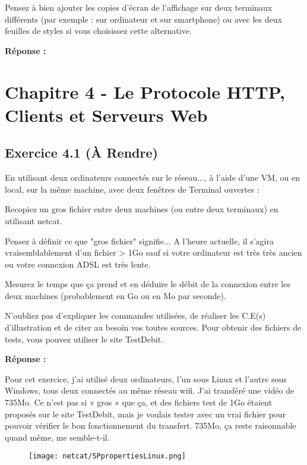 \documentclass[11pt]{article}
\begin{document}
Pensez à bien ajouter les copies d’écran de l’affichage sur deux terminaux différents (par exemple : sur ordinateur et sur smartphone) ou avec les deux feuilles de styles si vous choisissez cette alternative.

\textbf{Réponse :}

\newpage

\section*{Chapitre 4 - Le Protocole HTTP, Clients et Serveurs Web}

	\subsection*{Exercice 4.1 (À Rendre)}
	
	En utilisant deux ordinateurs connectés sur le réseau..., à l’aide d’une VM, ou en local, sur la même machine, avec deux fenêtres de Terminal ouvertes :

Recopiez un gros fichier entre deux machines (ou entre deux terminaux) en utilisant netcat.

Pensez à définir ce que "gros fichier" signifie... A l’heure actuelle, il s’agira vraisemblablement d’un fichier > 1Go sauf si votre ordinateur est très très ancien ou votre connexion ADSL est très lente.

Mesurez le temps que ça prend et en déduire le débit de la connexion entre les deux machines (probablement en Go ou en Mo par seconde).

N’oubliez pas d’expliquer les commandes utilisées, de réaliser les C.E(s) d’illustration et de citer au besoin vos toutes sources. Pour obtenir des fichiers de tests, vous pouvez utiliser le site TestDebit.

\textbf{Réponse :}

Pour cet exercice, j’ai utilisé deux ordinateurs, l’un sous Linux et l’autre sous Windows, tous deux connectés au même réseau wifi. J’ai transféré une vidéo de 735Mo. Ce n’est pas si « gros » que ça, et des fichiers test de 1Go étaient proposés sur le site TestDebit, mais je voulais tester avec un vrai fichier pour pouvoir vérifier le bon fonctionnement du transfert. 735Mo, ça reste raisonnable quand même, me semble-t-il.

	\begin{figure}[h]
	\texttt{[image: netcat/SPpropertiesLinux.png]}
	\end{figure}
\end{document}
